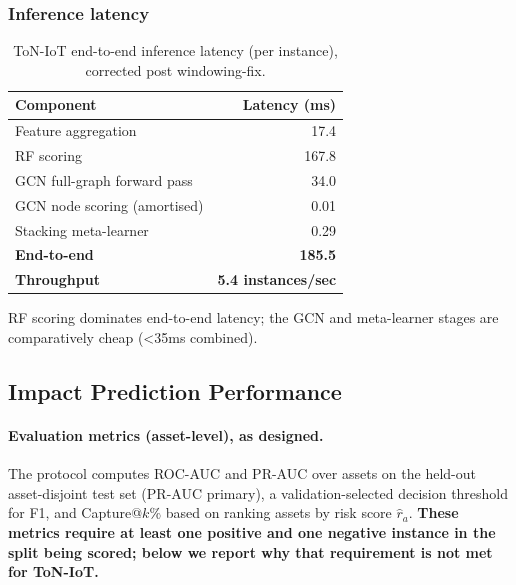 \documentclass[pdflatex,sn-mathphys-num]{sn-jnl}
\theoremstyle{thmstyleone}%
\theoremstyle{thmstyletwo}%
\theoremstyle{thmstylethree}%
\begin{document}
\subsubsection{Inference latency}
\label{subsec:latency_corrected}
\begin{table}[!t]
\centering
\caption{ToN-IoT end-to-end inference latency (per instance), corrected post windowing-fix.}
\label{tab:toniot_latency_corrected}
\begin{tabular}{lr}
\toprule
\textbf{Component} & \textbf{Latency (ms)} \\
\midrule
Feature aggregation & 17.4 \\
RF scoring & 167.8 \\
GCN full-graph forward pass & 34.0 \\
GCN node scoring (amortised) & 0.01 \\
Stacking meta-learner & 0.29 \\
\midrule
\textbf{End-to-end} & \textbf{185.5} \\
\textbf{Throughput} & \textbf{5.4 instances/sec} \\
\bottomrule
\end{tabular}
\end{table}
RF scoring dominates end-to-end latency; the GCN and meta-learner stages are comparatively cheap (\textless35ms combined).

\subsection{Impact Prediction Performance}
\label{sec:impact_discussion}

\paragraph{Evaluation metrics (asset-level), as designed.}
The protocol computes ROC-AUC and PR-AUC over assets on the held-out asset-disjoint test set (PR-AUC primary), a validation-selected decision threshold for F1, and Capture@$k\%$ based on ranking assets by risk score $\hat{r}_a$. \textbf{These metrics require at least one positive and one negative instance in the split being scored; below we report why that requirement is not met for ToN-IoT.}
\end{document}
